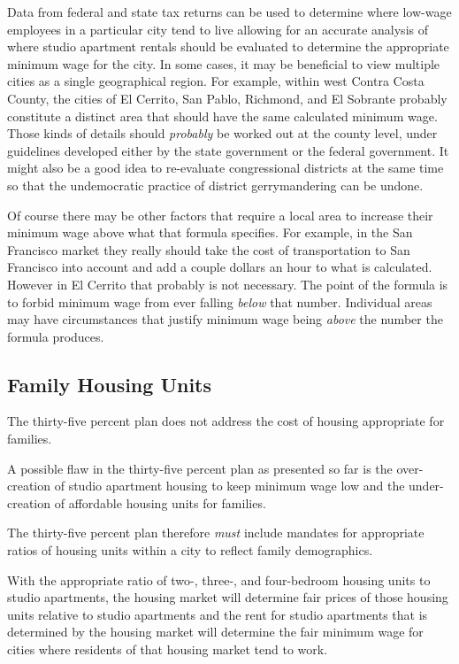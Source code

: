 Data from federal and state tax returns can be used to determine where low-wage employees in a particular city tend to live allowing for an accurate analysis of where studio apartment rentals should be evaluated to determine the appropriate minimum wage for the city. In some cases, it may be beneficial to view multiple cities as a single geographical region. For example, within west Contra Costa County, the cities of El Cerrito, San Pablo, Richmond, and El Sobrante probably constitute a distinct area that should have the same calculated minimum wage. Those kinds of details should \emph{probably} be worked out at the county level, under guidelines developed either by the state government or the federal government. It might also be a good idea to re-evaluate congressional districts at the same time so that the undemocratic practice of district gerrymandering can be undone.

Of course there may be other factors that require a local area to increase their minimum wage above what that formula specifies. For example, in the San Francisco market they really should take the cost of transportation to San Francisco into account and add a couple dollars an hour to what is calculated. However in El Cerrito that probably is not necessary. The point of the formula is to forbid minimum wage from ever falling \emph{below} that number. Individual areas may have circumstances that justify minimum wage being \emph{above} the number the formula produces.

\subsection{Family Housing Units}

The thirty-five percent plan does not address the cost of housing appropriate for families.

A possible flaw in the thirty-five percent plan as presented so far is the over-creation of studio apartment housing to keep minimum wage low and the under-creation of affordable housing units for families.

The thirty-five percent plan therefore \emph{must} include mandates for appropriate ratios of housing units within a city to reflect family demographics.

With the appropriate ratio of two-, three-, and four-bedroom housing units to studio apartments, the housing market will determine fair prices of those housing units relative to studio apartments and the rent for studio apartments that is determined by the housing market will determine the fair minimum wage for cities where residents of that housing market tend to work.

